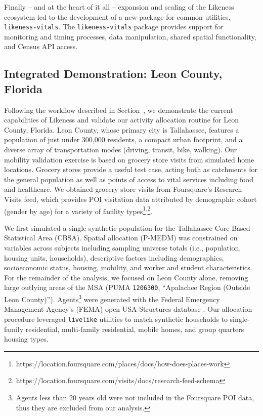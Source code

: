 Finally -- and at the heart of it all -- expansion and scaling of the Likeness ecosystem led to the development of a new package for common utilities, \texttt{likeness-vitals}. The \texttt{likeness-vitals} package provides support for monitoring and timing processes, data manipulation, shared spatial functionality, and Census API access.

\subsection{Integrated Demonstration: Leon County, Florida} \label{section:LCFL}

Following the workflow described in Section~, we demonstrate the current capabilities of Likeness and validate our activity allocation routine for Leon County, Florida. Leon County, whose primary city is Tallahassee, features a population of just under 300,000 residents, a compact urban footprint, and a diverse array of transportation modes (driving, transit, bike, walking). Our mobility validation exercise is based on grocery store visits from simulated home locations. Grocery stores provide a useful test case, acting both as catchments for the general population as well as points of access to vital services including food and healthcare. We obtained grocery store visits from Foursquare's Research Visits feed, which provides POI visitation data attributed by demographic cohort (gender by age) for a variety of facility types\footnote{https://location.foursquare.com/places/docs/how-does-places-work}\textsuperscript{,}\footnote{https://location.foursquare.com/visits/docs/research-feed-schema}. 

We first simulated a single synthetic population for the Tallahassee Core-Based Statistical Area (CBSA). Spatial allocation (P-MEDM) was constrained on variables across subjects including sampling universe totals (i.e., population, housing units, households), descriptive factors including demographics, socioeconomic status, housing, mobility, and worker and student characteristics. For the remainder of the analysis, we focused on Leon County alone, removing large outlying areas of the MSA (PUMA \texttt{1206300}, ``Apalachee Region (Outside Leon County)''). Agents\footnote{Agents less than 20 years old were not included in the Foursquare POI data, thus they are excluded from our analysis.} were generated with the Federal Emergency Management Agency's (FEMA) open USA Structures database \cite{yang2018building, usa_struct_2022}. Our allocation procedure leveraged \texttt{livelike} utilities to match synthetic households to single-family residential, multi-family residential, mobile homes, and group quarters housing types.

